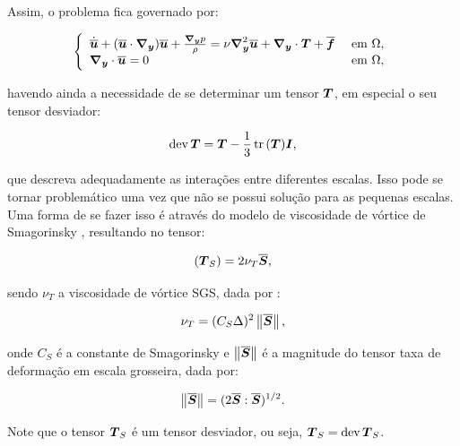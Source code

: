 Assim, o problema fica governado por:

\begin{equation}
    \left\{
    \begin{array}{ll}
        \dot{\overline{\boldsymbol{u}}}+(\overline{\boldsymbol{u}}\cdot\boldsymbol{\nabla_y})\overline{\boldsymbol{u}}+\frac{\boldsymbol{\nabla_y} p}{\rho}=\nu\boldsymbol{\nabla}^2_{\boldsymbol{y}}\overline{\boldsymbol{u}}+\boldsymbol{\nabla_y}\cdot\boldsymbol{T}+\overline{\boldsymbol{f}} & \text{ em }\Omega\text{,} \\
        \boldsymbol{\nabla_y}\cdot\overline{\boldsymbol{u}}=0                                                                                & \text{ em }\Omega\text{,}
    \end{array}
    \right.
\end{equation}

\noindent havendo ainda a necessidade de se determinar um tensor $\boldsymbol{T}$, em especial o seu tensor desviador:

\begin{equation}
    \mathop{\mathrm{dev}}\nolimits{\boldsymbol{T}}=\boldsymbol{T}-\frac{1}{3}\mathop{\mathrm{tr}}\nolimits{(\boldsymbol{T})}\boldsymbol{I}\text{,}
\end{equation}

\noindent que descreva adequadamente as interações entre diferentes escalas. Isso pode se tornar problemático uma vez que não se possui solução para as pequenas escalas. Uma forma de se fazer isso é através do modelo de viscosidade de vórtice de Smagorinsky \cite{smagorinsky1963general}, resultando no tensor:

\begin{equation}
    \left({\boldsymbol{T}_S}\right)=2\nu_T\overline{\boldsymbol{S}}\text{,}
\end{equation}

\noindent sendo $\nu_T$ a viscosidade de vórtice SGS, dada por \cite{germano1991dynamic,piomelli1999large,hughes2000large,bailly2015turbulence,katopodes2019free}:

\begin{equation}
    \nu_T=(C_S\Delta)^2\left\lVert{\overline{\boldsymbol{S}}}\right\lVert\text{,}
\end{equation}

\noindent onde $C_S$ é a constante de Smagorinsky e $\left\lVert{\overline{\boldsymbol{S}}}\right\lVert$ é a magnitude do tensor taxa de deformação em escala grosseira, dada por:

\begin{equation}
    \left\lVert{\overline{\boldsymbol{S}}}\right\lVert=(2\overline{\boldsymbol{S}}:\overline{\boldsymbol{S}})^{1/2}\text{.}
\end{equation}

Note que o tensor $\boldsymbol{T}_S$ é um tensor desviador, ou seja, $\boldsymbol{T}_S=\mathop{\mathrm{dev}}\nolimits{\boldsymbol{T}_S}$.

%

